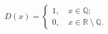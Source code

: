 \documentclass[preview]{standalone}
\begin{document}
\begin{align*}
D(x)=\begin{cases} 1, \quad x \in \mathbb{Q}; \\0, \quad x \in  \mathbb{R} \ \setminus \ \mathbb{Q}. \end{cases}
\end{align*}
\end{document}
